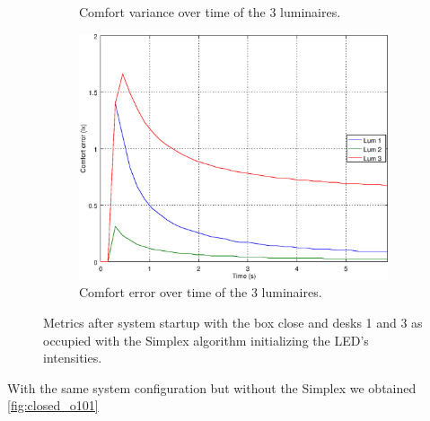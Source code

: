 \begin{figure}[ht]
\begin{subfigure}[t]{0.32\textwidth}
    \caption{Comfort variance over time of the 3 luminaires.}
    \label{fig:f_}
    \end{subfigure}
    \begin{subfigure}[t]{0.32\textwidth}
    \centering
    \includegraphics[width=.95\textwidth]{img/n_}
    \caption{Comfort error over time of the 3 luminaires.}
    \label{fig:n_}
    \end{subfigure}
    \caption{Metrics after system startup with the box close and desks 1 and 3 as occupied with the Simplex algorithm initializing the LED's intensities.}
    \label{fig:res_simplex}
\end{figure}

With the same system configuration but without the Simplex we obtained \ref{fig:closed_o101}

